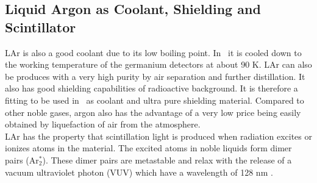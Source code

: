 \documentclass[encoding=utf8,british]{tumphthesis}
\begin{document}
\subsection{Liquid Argon as Coolant, Shielding and Scintillator} 
\label{sec:LArcoolant}


LAr is also a good coolant due to its low boiling point.
In \gerda\, it is cooled down to the working temperature of the germanium detectors at about 90 K.
LAr can also be produces with a very high purity by air separation and further distillation.
It also has good shielding capabilities of radioactive background.
It is therefore a fitting to be used in \gerda\ as coolant and ultra pure shielding material.
Compared to other noble gases, argon also has the advantage of a very low price being easily obtained by liquefaction of air from the atmosphere.
\\

LAr has the property that scintillation light is produced when radiation excites or ionizes atoms in the material.
The excited atoms in noble liquids form dimer pairs (Ar$^*_2$).
These dimer pairs are metastable and relax with the release of a vacuum ultraviolet photon (VUV)  which have a wavelength of 128 nm \cite{olsen_improvements_nodate}.
\\
\end{document}
